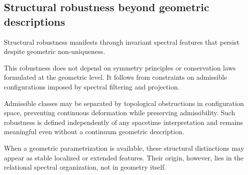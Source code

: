 \subsection{Structural robustness beyond geometric descriptions}
  \label{subsec:structural-robustness-beyond-geometric-descriptions}

  Structural robustness manifests through invariant spectral features
  that persist despite geometric non-uniqueness.

  This robustness does not depend on symmetry principles or conservation
  laws formulated at the geometric level.
  It follows from constraints on admissible configurations
  imposed by spectral filtering and projection.

  Admissible classes may be separated by topological obstructions
  in configuration space,
  preventing continuous deformation while preserving admissibility.
  Such robustness is defined independently of any spacetime
  interpretation and remains meaningful even without
  a continuum geometric description.

  When a geometric parametrization is available,
  these structural distinctions may appear as stable localized
  or extended features.
  Their origin, however, lies in the relational spectral organization,
  not in geometry itself.
